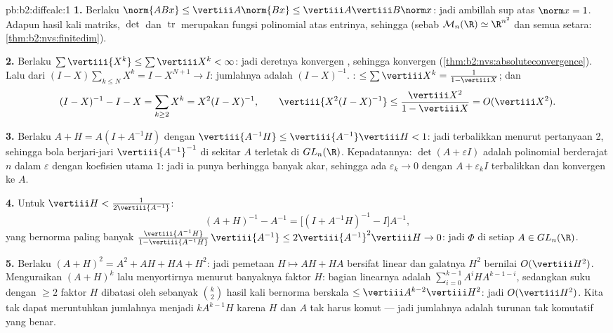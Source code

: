 \begin{solution}{pb:b2:diffcalc:1}
\textbf{1.} Berlaku $\norm{ABx} \leq \vertiii A\norm{Bx} \leq
\vertiii A\vertiii B\norm x$: jadi ambillah sup atas $\norm x = 1$.
Adapun hasil kali matriks, $\det$ dan $\operatorname{tr}$ merupakan fungsi
polinomial atas entrinya, sehingga  (sebab $\mathcal M_n(\R)
\simeq \R^{n^2}$ dan semua  setara:
\cref{thm:b2:nvs:finitedim}).

\textbf{2.} Berlaku $\sum\vertiii{X^k} \leq \sum\vertiii X^k <
\infty$: jadi deretnya konvergen , sehingga konvergen
(\cref{thm:b2:nvs:absoluteconvergence}). Lalu dari $(I -
X)\sum_{k\leq N}X^k = I - X^{N+1} \to I$: jumlahnya adalah $(I -
X)^{-1}$. : $\leq \sum\vertiii X^k = \frac{1}{1 -
\vertiii X}$; dan
\[
(I - X)^{-1} - I - X = \sum_{k\geq2}X^k = X^2(I - X)^{-1},
\qquad
\vertiii{X^2(I-X)^{-1}} \leq
\frac{\vertiii X^2}{1 - \vertiii X} = O(\vertiii X^2).
\]

\textbf{3.} Berlaku $A + H = A(I + A^{-1}H)$ dengan $\vertiii{A^{-1}H}
\leq \vertiii{A^{-1}}\vertiii H < 1$: jadi terbalikkan menurut pertanyaan 2,
sehingga bola  berjari-jari $\vertiii{A^{-1}}^{-1}$ di sekitar $A$ terletak
di $GL_n(\R)$. Kepadatannya: $\det(A + \varepsilon I)$ adalah polinomial
berderajat $n$ dalam $\varepsilon$ dengan koefisien utama $1$: jadi ia
punya berhingga banyak akar, sehingga ada $\varepsilon_k \to 0$
dengan $A + \varepsilon_kI$ terbalikkan dan konvergen ke $A$.

\textbf{4.} Untuk $\vertiii H < \frac{1}{2\vertiii{A^{-1}}}$:
\[
(A + H)^{-1} - A^{-1}
= \bigl[(I + A^{-1}H)^{-1} - I\bigr]A^{-1},
\]
yang bernorma paling banyak $\frac{\vertiii{A^{-1}H}}{1 -
\vertiii{A^{-1}H}}\,\vertiii{A^{-1}} \leq
2\vertiii{A^{-1}}^2\vertiii H \to 0$: jadi $\Phi$  di
setiap $A \in GL_n(\R)$.

\textbf{5.} Berlaku $(A+H)^2 = A^2 + AH + HA + H^2$: jadi pemetaan $H
\mapsto AH + HA$ bersifat linear dan galatnya $H^2$ bernilai
$O(\vertiii H^2)$. Menguraikan $(A + H)^k$ lalu menyortirnya menurut
banyaknya faktor $H$: bagian linearnya adalah
$\sum_{i=0}^{k-1}A^iHA^{k-1-i}$, sedangkan suku dengan $\geq 2$
faktor $H$ dibatasi oleh sebanyak $\binom k2$ hasil kali bernorma
berskala $\leq \vertiii A^{k-2}\vertiii H^2$: jadi $O(\vertiii H^2)$.
Kita tak dapat meruntuhkan jumlahnya menjadi $kA^{k-1}H$ karena $H$ dan $A$
tak harus komut --- jadi jumlahnya adalah turunan tak komutatif
yang benar.


\end{solution}
